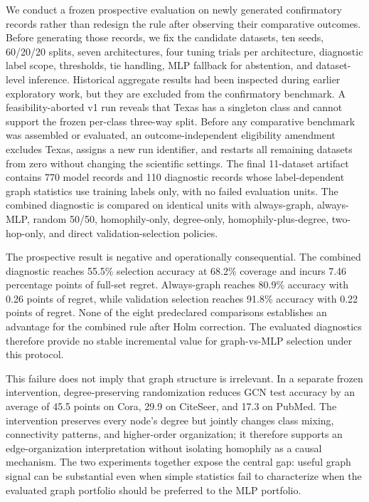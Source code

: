 We conduct a frozen prospective evaluation on newly generated confirmatory records rather than redesign the rule after observing their comparative outcomes. Before generating those records, we fix the candidate datasets, ten seeds, 60/20/20 splits, seven architectures, four tuning trials per architecture, diagnostic label scope, thresholds, tie handling, MLP fallback for abstention, and dataset-level inference. Historical aggregate results had been inspected during earlier exploratory work, but they are excluded from the confirmatory benchmark. A feasibility-aborted v1 run reveals that Texas has a singleton class and cannot support the frozen per-class three-way split. Before any comparative benchmark was assembled or evaluated, an outcome-independent eligibility amendment excludes Texas, assigns a new run identifier, and restarts all remaining datasets from zero without changing the scientific settings. The final 11-dataset artifact contains 770 model records and 110 diagnostic records whose label-dependent graph statistics use training labels only, with no failed evaluation units. The combined diagnostic is compared on identical units with always-graph, always-MLP, random 50/50, homophily-only, degree-only, homophily-plus-degree, two-hop-only, and direct validation-selection policies.

The prospective result is negative and operationally consequential. The combined diagnostic reaches 55.5\% selection accuracy at 68.2\% coverage and incurs 7.46 percentage points of full-set regret. Always-graph reaches 80.9\% accuracy with 0.26 points of regret, while validation selection reaches 91.8\% accuracy with 0.22 points of regret. None of the eight predeclared comparisons establishes an advantage for the combined rule after Holm correction. The evaluated diagnostics therefore provide no stable incremental value for graph-vs-MLP selection under this protocol.

This failure does not imply that graph structure is irrelevant. In a separate frozen intervention, degree-preserving randomization reduces GCN test accuracy by an average of 45.5 points on Cora, 29.9 on CiteSeer, and 17.3 on PubMed. The intervention preserves every node's degree but jointly changes class mixing, connectivity patterns, and higher-order organization; it therefore supports an edge-organization interpretation without isolating homophily as a causal mechanism. The two experiments together expose the central gap: useful graph signal can be substantial even when simple statistics fail to characterize when the evaluated graph portfolio should be preferred to the MLP portfolio.

